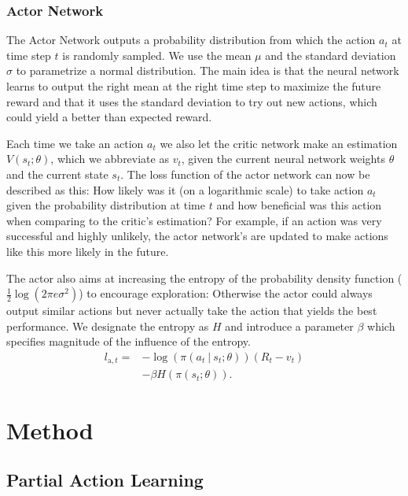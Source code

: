\documentclass[sigconf]{acmart}
\newcommand\givenbase[1][]{\:#1\lvert\:}
\let\given\givenbase
\begin{document}
\subsubsection{Actor Network}
\label{subsubsec:genericactor}

The Actor Network outputs a probability distribution from which the action $a_t$ at time step $t$ is randomly sampled. We use the mean $\mu$ and the standard deviation $\sigma$ to parametrize a normal distribution. The main idea is that the neural network learns to output the right mean at the right time step to maximize the future reward and that it uses the standard deviation to try out new actions, which could yield a better than expected reward. 

Each time we take an action $a_t$ we also let the critic network make an estimation $V(s_t; \theta)$, which we abbreviate as $v_t$, given the current neural network weights $\theta$ and the current state $s_t$. The loss function of the actor network can now be described as this: How likely was it (on a logarithmic scale) to take action $a_t$ given the probability distribution at time $t$ and how beneficial was this action when comparing to the critic's estimation? For example, if an action was very successful and highly unlikely, the actor network's are updated to make actions like this more likely in the future. 

The actor also aims at increasing the entropy of the probability density function ($\frac{1}{2} \log \left( 2 \pi e \sigma^2 \right)$) to encourage exploration: Otherwise the actor could always output similar actions but never actually take the action that yields the best performance. We designate the entropy as $H$ and introduce a parameter $\beta$ which specifies magnitude of the influence of the entropy. 
\begin{align*}
l_{\text{a},t} =& -\log \left( \pi\left( a_t \given s_t; \theta \right)\right)\left( R_t - v_t \right)\\ 
&- \beta H\left( \pi\left( s_t; \theta \right)\right).
\end{align*}

\section{Method}
\subsection{Partial Action Learning}
\label{subsec:pal}
\end{document}
